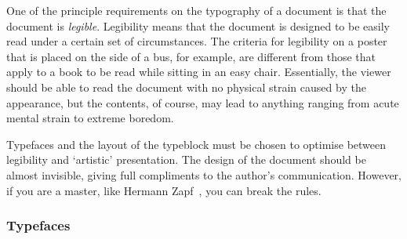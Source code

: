 \documentclass[10pt,a4paper,extrafontsizes]{memoir}
\begin{document}
\begin{paracol}{2}
\switchEng
    One of the principle requirements on the typography of a document is 
that the document is \emph{legible}. Legibility 
means that the document 
is designed to be easily read under a certain set of circumstances. 
The criteria for
legibility on a poster that is placed on the side of a bus, for example, are
different from those that apply to a book to be read while sitting in an
easy chair. Essentially, the viewer should be able to read the document
with no physical strain caused by the appearance, but the contents, 
of course, may lead to anything ranging from acute mental strain to 
extreme boredom.

    Typefaces and the layout of the 
typeblock must be 
chosen to optimise between legibility and `artistic' presentation. 
The design of the document should be almost invisible, giving full 
compliments to the author's communication. However, if you are a master, 
like Hermann Zapf~\autocite{ZAPF00}, you can break the rules.
\end{paracol}


\subsubsection{Typefaces}
\end{document}
